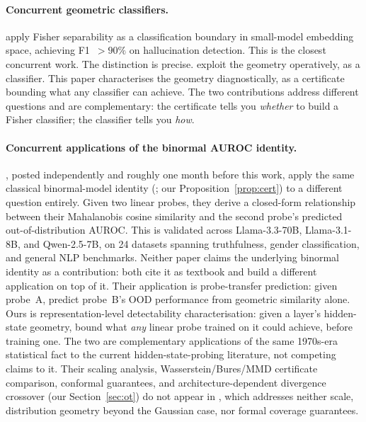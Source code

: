 \documentclass[10pt,twocolumn]{article}
\begin{document}
\paragraph{Concurrent geometric classifiers.}
\citet{ricco2026geometric} apply Fisher separability as a
classification boundary in small-model embedding space, achieving
F1~$>90\%$ on hallucination detection. This is the closest concurrent
work. The distinction is precise. \citeauthor{ricco2026geometric}
exploit the geometry operatively, as a classifier. This paper
characterises the geometry diagnostically, as a certificate bounding
what any classifier can achieve. The two contributions address
different questions and are complementary: the certificate tells you
\emph{whether} to build a Fisher classifier; the classifier tells you
\emph{how}.

\paragraph{Concurrent applications of the binormal AUROC identity.}
\citet{ying2026comparing}, posted independently and roughly one month
before this work, apply the same classical binormal-model identity
(\citealp{green1966signal,bamber1975area,hanley1982meaning}; our
Proposition~\ref{prop:cert}) to a different question entirely. Given
two linear probes, they derive a closed-form relationship between
their Mahalanobis cosine similarity and the second probe's predicted
out-of-distribution AUROC. This is validated across Llama-3.3-70B,
Llama-3.1-8B, and Qwen-2.5-7B, on 24 datasets spanning truthfulness,
gender classification, and general NLP benchmarks. Neither paper
claims the underlying binormal identity as a contribution: both cite
it as textbook and build a different application on top of it. Their
application is probe-transfer prediction: given probe~A, predict
probe~B's OOD performance from geometric similarity alone. Ours is
representation-level detectability characterisation: given a layer's
hidden-state geometry, bound what \emph{any} linear probe trained on it
could achieve, before training one. The two are complementary
applications of the same 1970s-era statistical fact to the current
hidden-state-probing literature, not competing claims to it. Their
scaling analysis, Wasserstein/Bures/MMD certificate comparison,
conformal guarantees, and architecture-dependent divergence crossover
(our Section~\ref{sec:ot}) do not appear in \citet{ying2026comparing},
which addresses neither scale, distribution geometry beyond the
Gaussian case, nor formal coverage guarantees.
\end{document}
